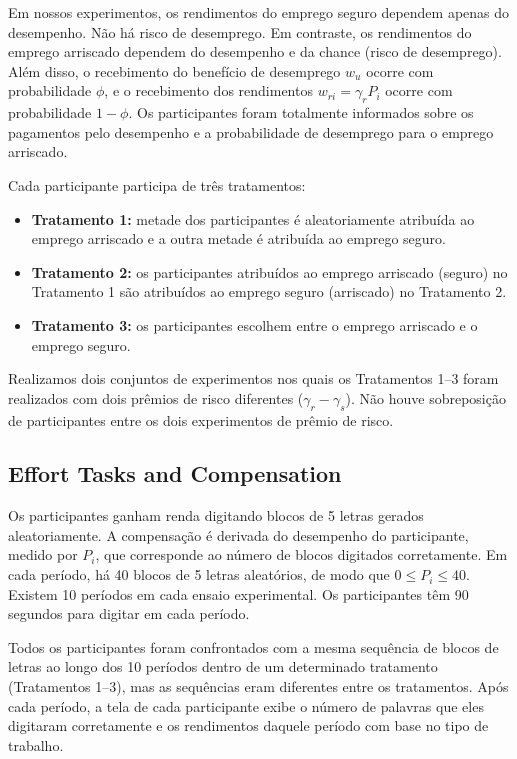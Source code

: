 \documentclass[a4paper,12pt]{article}[abntex2]
\begin{document}
Em nossos experimentos, os rendimentos do emprego seguro dependem apenas do desempenho. Não há risco de desemprego. Em contraste, os rendimentos do emprego arriscado dependem do desempenho e da chance (risco de desemprego). Além disso, o recebimento do benefício de desemprego \( w_u \) ocorre com probabilidade \( \phi \), e o recebimento dos rendimentos \( w_{ri} = \gamma_r P_i \) ocorre com probabilidade \( 1 - \phi \). Os participantes foram totalmente informados sobre os pagamentos pelo desempenho e a probabilidade de desemprego para o emprego arriscado.

Cada participante participa de três tratamentos:

\begin{itemize}
    \item \textbf{Tratamento 1:} metade dos participantes é aleatoriamente atribuída ao emprego arriscado e a outra metade é atribuída ao emprego seguro.
    \item \textbf{Tratamento 2:} os participantes atribuídos ao emprego arriscado (seguro) no Tratamento 1 são atribuídos ao emprego seguro (arriscado) no Tratamento 2.
    \item \textbf{Tratamento 3:} os participantes escolhem entre o emprego arriscado e o emprego seguro.
\end{itemize}

Realizamos dois conjuntos de experimentos nos quais os Tratamentos 1–3 foram realizados com dois prêmios de risco diferentes (\( \gamma_r - \gamma_s \)). Não houve sobreposição de participantes entre os dois experimentos de prêmio de risco.

\subsection{\textbf{Effort Tasks and Compensation}}

Os participantes ganham renda digitando blocos de 5 letras gerados aleatoriamente. A compensação é derivada do desempenho do participante, medido por \( P_i \), que corresponde ao número de blocos digitados corretamente. Em cada período, há 40 blocos de 5 letras aleatórios, de modo que \( 0 \leq P_i \leq 40 \). Existem 10 períodos em cada ensaio experimental. Os participantes têm 90 segundos para digitar em cada período.

Todos os participantes foram confrontados com a mesma sequência de blocos de letras ao longo dos 10 períodos dentro de um determinado tratamento (Tratamentos 1–3), mas as sequências eram diferentes entre os tratamentos. Após cada período, a tela de cada participante exibe o número de palavras que eles digitaram corretamente e os rendimentos daquele período com base no tipo de trabalho.
\end{document}
